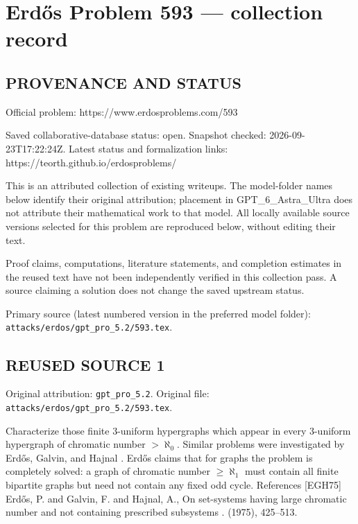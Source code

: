 \section*{Erd\H{o}s Problem 593 --- collection record}

\subsection*{PROVENANCE AND STATUS}
Official problem: https://www.erdosproblems.com/593

Saved collaborative-database status: open.
Snapshot checked: 2026-09-23T17:22:24Z.
Latest status and formalization links: https://teorth.github.io/erdosproblems/

This is an attributed collection of existing writeups. The model-folder names below identify their original attribution; placement in GPT\_6\_Astra\_Ultra does not attribute their mathematical work to that model. All locally available source versions selected for this problem are reproduced below, without editing their text.

Proof claims, computations, literature statements, and completion estimates in the reused text have not been independently verified in this collection pass. A source claiming a solution does not change the saved upstream status.

Primary source (latest numbered version in the preferred model folder): \texttt{attacks/erdos/gpt\_pro\_5.2/593.tex}.

\subsection*{REUSED SOURCE 1}
Original attribution: \texttt{gpt\_pro\_5.2}.
Original file: \texttt{attacks/erdos/gpt\_pro\_5.2/593.tex}.


Characterize those finite 3-uniform hypergraphs which appear in every 3-uniform hypergraph of chromatic number $>\aleph_0$. Similar problems were investigated by Erd\H{o}s, Galvin, and Hajnal \cite{EGH75}. Erd\H{o}s claims that for graphs the problem is completely solved: a graph of chromatic number $\geq \aleph_1$ must contain all finite bipartite graphs but need not contain any fixed odd cycle. References [EGH75] Erd\H{o}s, P. and Galvin, F. and Hajnal, A., On set-systems having large chromatic number and not containing prescribed subsystems . (1975), 425--513.

